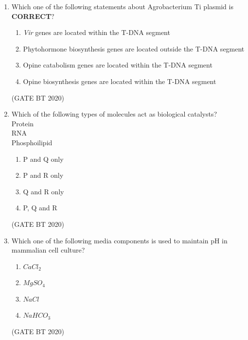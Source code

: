 \documentclass[journal,12pt,onecolumn]{IEEEtran}
\theoremstyle{remark}
\begin{document}
\begin{enumerate}[label=Q\arabic*:]
\item Which one of the following statements about Agrobacterium Ti plasmid is \textbf{CORRECT}$?$
\begin{multicols}{2}
\begin{enumerate}

\item\;\textit{Vir} genes are located within the T-DNA segment
\item\;Phytohormone biosynthesis genes are located outside the T-DNA segment
\item\;Opine catabolism genes are located within the T-DNA segment
\item\;Opine biosynthesis genes are located within the T-DNA segment

\end{enumerate} 
\end{multicols}
\hfill(GATE BT 2020)

\item Which of the following types of molecules act as biological catalysts?\\
Protein\\
RNA\\
Phosphoilipid\\
\begin{multicols}{2}
\begin{enumerate}

\item\;P and Q only
\item\;P and R only
\item\;Q and R only
\item\;P, Q and R

\end{enumerate}
\end{multicols}
\hfill(GATE BT 2020)

\item Which one of the following media components is used to maintain pH in mammalian cell culture?
\begin{multicols}{4}
\begin{enumerate}

\item\;$CaCl_2$
\item\;$MgSO_4$
\item\;$NaCl$
\item\;$NaHCO_3$

\end{enumerate} 
\end{multicols}
\hfill(GATE BT 2020)


\end{enumerate}
\end{document}

